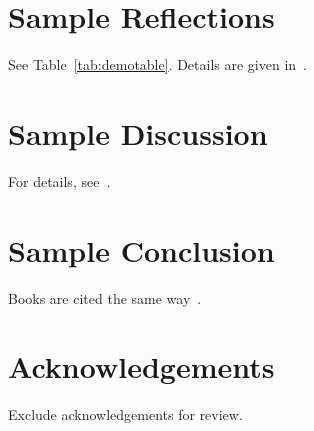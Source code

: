 \documentclass{article}
\begin{document}
\section{Sample Reflections}

See Table~\ref{tab:demotable}. \lipsum[5] Details are given in~.

\section{Sample Discussion}

\lipsum[6] For details, see~.

\section{Sample Conclusion}
\lipsum[7] Books are cited the same way~\cite{aoett}.

\section*{Acknowledgements}
Exclude acknowledgements for review.



\end{document}
